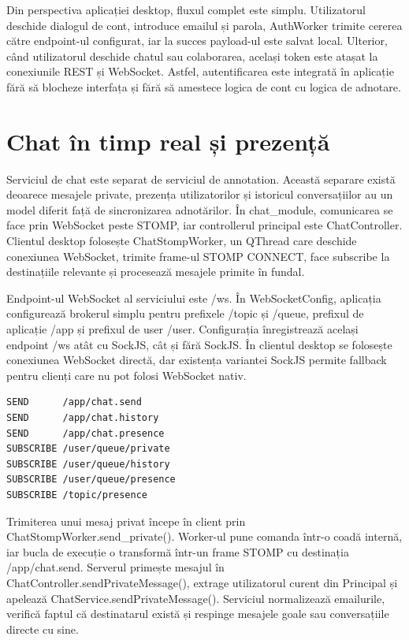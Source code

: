 Din perspectiva aplicației desktop, fluxul complet este simplu. Utilizatorul deschide dialogul de cont, introduce emailul și parola, AuthWorker trimite cererea către endpoint-ul configurat, iar la succes payload-ul este salvat local. Ulterior, când utilizatorul deschide chatul sau colaborarea, același token este atașat la conexiunile REST și WebSocket. Astfel, autentificarea este integrată în aplicație fără să blocheze interfața și fără să amestece logica de cont cu logica de adnotare.

\section{Chat în timp real și prezență}

Serviciul de chat este separat de serviciul de annotation. Această separare există deoarece mesajele private, prezența utilizatorilor și istoricul conversațiilor au un model diferit față de sincronizarea adnotărilor. În chat\_module, comunicarea se face prin WebSocket peste STOMP, iar controllerul principal este ChatController. Clientul desktop folosește ChatStompWorker, un QThread care deschide conexiunea WebSocket, trimite frame-ul STOMP CONNECT, face subscribe la destinațiile relevante și procesează mesajele primite în fundal.

Endpoint-ul WebSocket al serviciului este /ws. În WebSocketConfig, aplicația configurează brokerul simplu pentru prefixele /topic și /queue, prefixul de aplicație /app și prefixul de user /user. Configurația înregistrează același endpoint /ws atât cu SockJS, cât și fără SockJS. În clientul desktop se folosește conexiunea WebSocket directă, dar existența variantei SockJS permite fallback pentru clienți care nu pot folosi WebSocket nativ.

\begin{verbatim}
SEND      /app/chat.send
SEND      /app/chat.history
SEND      /app/chat.presence
SUBSCRIBE /user/queue/private
SUBSCRIBE /user/queue/history
SUBSCRIBE /user/queue/presence
SUBSCRIBE /topic/presence
\end{verbatim}

Trimiterea unui mesaj privat începe în client prin ChatStompWorker.send\_private(). Worker-ul pune comanda într-o coadă internă, iar bucla de execuție o transformă într-un frame STOMP cu destinația /app/chat.send. Serverul primește mesajul în ChatController.sendPrivateMessage(), extrage utilizatorul curent din Principal și apelează ChatService.sendPrivateMessage(). Serviciul normalizează emailurile, verifică faptul că destinatarul există și respinge mesajele goale sau conversațiile directe cu sine.

